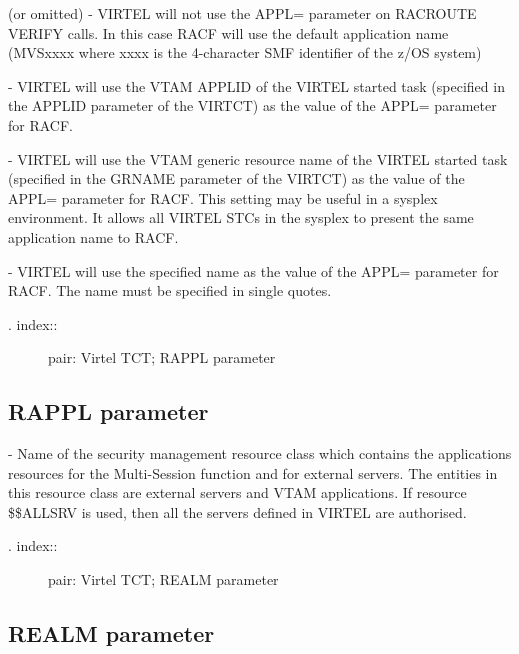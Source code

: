 \documentclass[letterpaper,10pt,english]{sphinxmanual}
\begin{document}
 (or omitted) - VIRTEL will not use the APPL= parameter on RACROUTE VERIFY calls. In this case RACF will use the default application name (MVSxxxx where xxxx is the 4-character SMF identifier of the z/OS system)

 - VIRTEL will use the VTAM APPLID of the VIRTEL started task (specified in the APPLID parameter of the VIRTCT) as the value of the APPL= parameter for RACF.

 - VIRTEL will use the VTAM generic resource name of the VIRTEL started task (specified in the GRNAME parameter of the VIRTCT) as the value of the APPL= parameter for RACF. This setting may be useful in a sysplex environment. It allows all VIRTEL STCs in the sysplex to present the same application name to RACF.

 - VIRTEL will use the specified name as the value of the APPL= parameter for RACF. The name must be specified in single quotes.
\begin{description}
\item[{. index::}] \leavevmode
pair: Virtel TCT; RAPPL parameter

\end{description}


\subsection{RAPPL parameter}
\label{\detokenize{Installation_Guide:rappl-parameter}}
\begin{sphinxVerbatim}[commandchars=\\\{\}]
 
\end{sphinxVerbatim}

 - Name of the security management resource class which contains the applications resources for the Multi-Session function and for external servers. The entities in this resource class are external servers and VTAM applications. If resource \$\$ALLSRV is used, then all the servers defined in VIRTEL are authorised.
\begin{description}
\item[{. index::}] \leavevmode
pair: Virtel TCT; REALM parameter

\end{description}


\subsection{REALM parameter}
\label{\detokenize{Installation_Guide:realm-parameter}}
\begin{sphinxVerbatim}[commandchars=\\\{\}]
 
\end{sphinxVerbatim}
\end{document}
